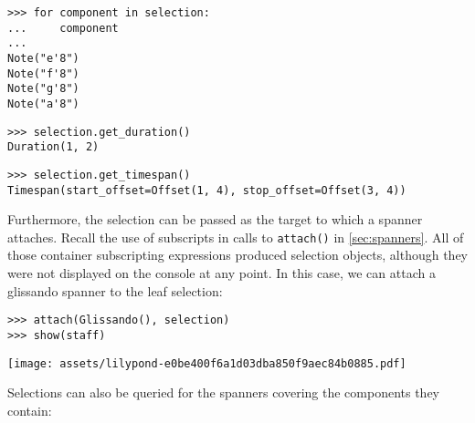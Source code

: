 \begin{abjadbookoutput}
\begin{singlespacing}
\vspace{-0.5\baselineskip}
\begin{lstlisting}
>>> for component in selection:
...     component
...
Note("e'8")
Note("f'8")
Note("g'8")
Note("a'8")
\end{lstlisting}
\begin{lstlisting}
>>> selection.get_duration()
Duration(1, 2)
\end{lstlisting}
\begin{lstlisting}
>>> selection.get_timespan()
Timespan(start_offset=Offset(1, 4), stop_offset=Offset(3, 4))
\end{lstlisting}
\end{singlespacing}
\end{abjadbookoutput}

\noindent Furthermore, the selection can be passed as the target to which a
spanner attaches. Recall the use of subscripts in calls to \texttt{attach()} in
\autoref{sec:spanners}. All of those container subscripting expressions
produced selection objects, although they were not displayed on the console at
any point. In this case, we can attach a glissando spanner to the leaf
selection:

\begin{comment}
<abjad>
attach(Glissando(), selection)
show(staff)
</abjad>
\end{comment}

\begin{abjadbookoutput}
\begin{singlespacing}
\vspace{-0.5\baselineskip}
\begin{lstlisting}
>>> attach(Glissando(), selection)
>>> show(staff)
\end{lstlisting}
\noindent\texttt{[image: assets/lilypond-e0be400f6a1d03dba850f9aec84b0885.pdf]}
\end{singlespacing}
\end{abjadbookoutput}

\noindent Selections can also be queried for the spanners covering the
components they contain:

\begin{comment}
<abjad>
for spanner in selection.get_spanners():
    spanner

</abjad>
\end{comment}


